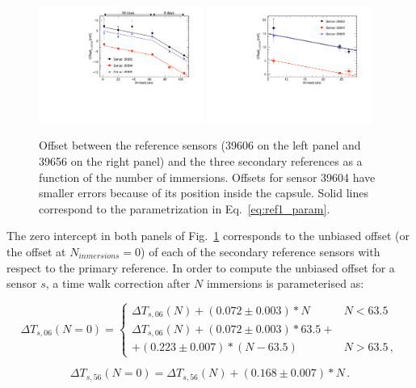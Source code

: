 \begin{figure}[htbp]
\centering
{\includegraphics[width=0.48\textwidth]{./figure_12_a.pdf}}
{\includegraphics[width=0.48\textwidth]{./figure_12_b.pdf}}
\caption{Offset between the reference sensors (39606 on the left panel and 39656 on the right panel) and the three secondary references as a function of the number of immersions. Offsets for sensor 39604 have smaller errors because of its position inside the capsule. Solid lines correspond to the parametrization in Eq.~\ref{eq:ref1_param}.}
\label{fig:offset_ref}
\end{figure}

The zero intercept in both panels of Fig.~\ref{fig:offset_ref} corresponds to the unbiased offset (or the offset at $N_{inmersions}=0$) of each of the secondary reference sensors with respect to the primary reference. In order to compute the unbiased offset for a sensor $s$, a time walk correction after $N$ immersions is parameterised as:

\begin{equation}
\Delta T_{s,06}(N=0)=
    \begin{cases}
        \Delta T_{s,06}(N)+(0.072\pm0.003)*N                             & N<63.5\\
        \Delta T_{s,06}(N)+(0.072\pm0.003)*63.5+\\+(0.223\pm0.007)*(N-63.5) & N>63.5 \,,
    \end{cases}
    \label{eq:ref1_param}
\end{equation}

\begin{equation}
\Delta T_{s,56}(N=0)=\Delta T_{s,56}(N)+(0.168\pm0.007)*N  \, .
\label{eq:ref2_param}
\end{equation}

